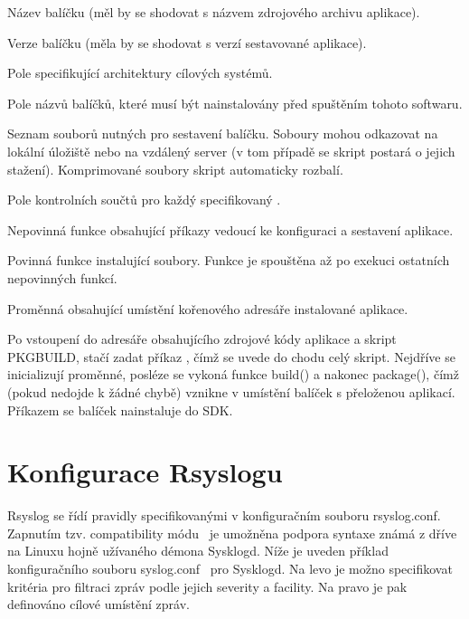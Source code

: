 \documentclass[thesis=B,czech]{FITthesis}[2012/06/26]
\begin{document}
\begin{description}
  \setlength\itemsep{-1ex}
  \item [pkgname:] Název balíčku (měl by se shodovat s názvem zdrojového archivu aplikace).
  \item [pkgver:] Verze balíčku (měla by se shodovat s verzí sestavované aplikace).
  \item [arch:] Pole specifikující architektury cílových systémů.
  \item [depends:] Pole názvů balíčků, které musí být nainstalovány před spuštěním tohoto softwaru.
  \item [source:] Seznam souborů nutných pro sestavení balíčku. Soboury mohou odkazovat na lokální úložiště nebo na vzdálený server (v tom případě se skript postará o jejich stažení). Komprimované soubory skript automaticky rozbalí.
  \item [md5sum:] Pole kontrolních součtů pro každý specifikovaný .
  \item [build():] Nepovinná funkce obsahující příkazy vedoucí ke konfiguraci a sestavení aplikace.
  \item [package():] Povinná funkce instalující soubory. Funkce je spouštěna až po exekuci ostatních nepovinných funkcí.
  \item [pkgdir:] Proměnná obsahující umístění kořenového adresáře instalované aplikace.
\end{description}

Po vstoupení do adresáře obsahujícího zdrojové kódy aplikace a skript PKGBUILD, stačí zadat příkaz , čímž se uvede do chodu celý skript. Nejdříve se inicializují proměnné, posléze se vykoná funkce build() a nakonec package(), čímž (pokud nedojde k žádné chybě) vznikne v umístění  balíček s přeloženou aplikací.
Příkazem  se balíček nainstaluje do SDK.

\section{Konfigurace Rsyslogu}
Rsyslog se řídí pravidly specifikovanými v konfiguračním souboru rsyslog.conf. Zapnutím tzv. compatibility módu~\cite{Rsyslog-comp-mode} je umožněna podpora syntaxe známá z dříve na Linuxu hojně užívaného démona Sysklogd. Níže je uveden příklad konfiguračního souboru syslog.conf~\cite{Syslog-conf} pro Sysklogd. Na levo je možno specifikovat kritéria pro filtraci zpráv podle jejich severity a facility. Na pravo je pak definováno cílové umístění zpráv.
\end{document}

